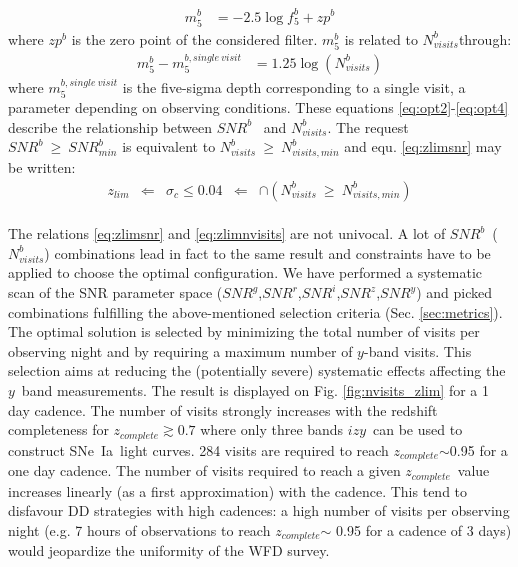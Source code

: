 \documentclass[skiphelvet,twocolumn]{aastex63}
\newcommand{\snrb}{\mbox{$SNR^b$}}
\newcommand{\snrbmin}{\mbox{$SNR^b_{min}$}}
\newcommand{\snrg}{\mbox{$SNR^g$}}
\newcommand{\snrr}{\mbox{$SNR^r$}}
\newcommand{\snri}{\mbox{$SNR^i$}}
\newcommand{\snrz}{\mbox{$SNR^z$}}
\newcommand{\snry}{\mbox{$SNR^y$}}
\newcommand{\bi}{{$i$}}
\newcommand{\bz}{{$z$}}
\newcommand{\by}{{$y$}}
\newcommand{\sigc}{\mbox{$\sigma_c$}}
\newcommand{\zlim}{\mbox{$z_{lim}$}}
\newcommand{\sne}{{SNe~Ia}}
\newcommand{\zcomp}{\mbox{$z_{complete}$}}
\newcommand{\nvisitsb}{\mbox{$N_{visits}^b$}}
\newcommand{\nvisitsbmin}{\mbox{$N_{visits,min}^b$}}
\begin{document}
\begin{equation}\label{eq:opt3}
  \begin{aligned}
    m_5^b &= -2.5 \log f_5^b+zp^b
    \end{aligned}
\end{equation}
where $zp^b$ is the zero point of the considered filter.  $m_5^b$ is related to \nvisitsb through:
\begin{equation}\label{eq:opt4}
  \begin{aligned}
    m_5^b - m_5^{b, single~visit} & =  1.25 \log(N_{visits}^b)
    \end{aligned}
\end{equation}
where $m_5^{b, single~visit}$ is the five-sigma depth corresponding to a single visit, a parameter depending on observing conditions. These equations \eqref{eq:opt2}-\eqref{eq:opt4} describe the relationship between \snrb~ and \nvisitsb. The request $\snrb~\geq~\snrbmin$ is equivalent to $\nvisitsb~\geq~\nvisitsbmin$ and equ. \eqref{eq:zlimsnr} may be written:
\begin{equation}
  \begin{aligned}
    \zlim &\Longleftarrow & \sigc \leq 0.04 & \Longleftarrow &\cap (\nvisitsb~\geq~\nvisitsbmin)
    \end{aligned}
 \label{eq:zlimnvisits}
\end{equation}
\\
The relations \eqref{eq:zlimsnr} and \eqref{eq:zlimnvisits} are not univocal. A lot of \snrb~(\nvisitsb) combinations lead in fact to the same result and constraints have to be applied to choose the optimal configuration. We have performed a systematic scan of the SNR parameter space (\snrg,\snrr,\snri,\snrz,\snry) and picked combinations fulfilling the above-mentioned selection criteria (Sec. \ref{sec:metrics}). The optimal solution is selected by minimizing the total number of visits per observing night and by requiring a maximum number of \by-band visits. This selection aims at reducing the (potentially severe) systematic effects affecting the \by~band measurements. The result is displayed on Fig. \ref{fig:nvisits_zlim} for a 1 day cadence. The number of visits strongly increases with the redshift completeness for \zcomp$\gtrsim 0.7$ where only three bands \bi\bz\by~can be used to construct \sne~light curves. 284 visits are required to reach \zcomp$\sim$0.95 for a one day cadence. The number of visits required to reach a given \zcomp~value increases linearly (as a first approximation) with the cadence. This tend to disfavour DD strategies with high cadences: a high number of visits per observing night (e.g. 7 hours of observations to reach \zcomp $\sim$ 0.95 for a cadence of 3 days) would jeopardize the uniformity of the WFD survey.
\end{document}
